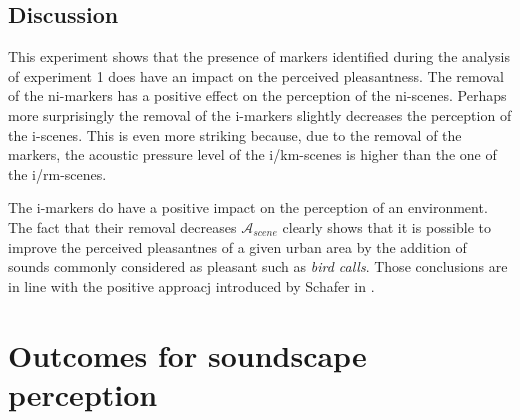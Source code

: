 \documentclass[twoside,twocolumn]{article}
\begin{document}
\subsection{Discussion}


This experiment shows that the presence of markers identified during the analysis of experiment 1 does have an impact on the perceived pleasantness. The removal of the ni-markers has a positive effect on the perception of the ni-scenes. Perhaps more surprisingly the removal of the i-markers slightly decreases the perception of the i-scenes. This is even more striking because, due to the removal of the markers, the acoustic pressure level of the i/km-scenes is higher than the one of the i/rm-scenes.


The i-markers do have a positive impact on the perception of an environment. The fact that their removal decreases $\mathcal{A}_{scene}$ clearly shows that it is possible to improve the perceived pleasantnes of a given urban area by the addition of sounds commonly considered as pleasant such as \emph{bird calls}. Those conclusions are in line with the positive approacj introduced by Schafer in \cite{schafer1977tuning}.



\section{Outcomes for soundscape perception}
\label{sec:conclusion}
\end{document}

